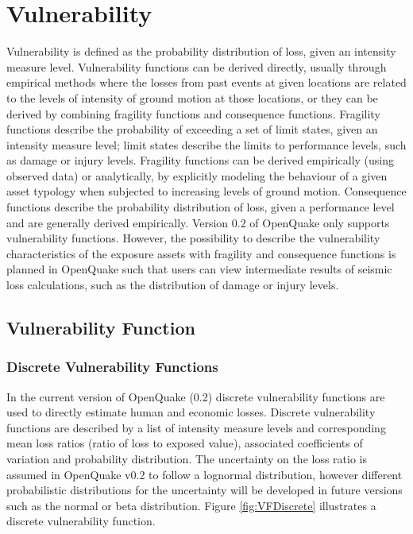 \section{Vulnerability}
Vulnerability is defined as the probability distribution of loss, given an intensity measure level. Vulnerability functions can be derived directly, usually through empirical methods where the losses from past events at given locations are related to the levels of intensity of ground motion at those locations, or they can be derived by combining fragility functions and consequence functions. Fragility functions describe the probability of exceeding a set of limit states, given an intensity measure level; limit states describe the limits to performance levels, such as damage or injury levels. Fragility functions can be derived empirically (using observed data) or analytically, by explicitly modeling the behaviour of a given asset typology when subjected to increasing levels of ground motion. Consequence functions describe the probability distribution of loss, given a performance level and are generally derived empirically. 
Version 0.2 of OpenQuake only supports vulnerability functions. However, the possibility to describe the vulnerability characteristics of the exposure assets with fragility and consequence functions is planned in OpenQuake such that users can view intermediate results of seismic loss calculations, such as the distribution of damage or injury levels. 

\subsection{Vulnerability Function}
\subsubsection{Discrete Vulnerability Functions}
In the current version of OpenQuake (0.2) discrete vulnerability functions are used to directly estimate human and economic losses. Discrete vulnerability functions are described by a list of intensity measure levels and corresponding mean loss ratios (ratio of loss to exposed value), associated coefficients of variation and probability distribution. The uncertainty on the loss ratio is assumed in OpenQuake v0.2 to follow a lognormal distribution, however different probabilistic distributions for the uncertainty will be developed in future versions such as the normal or beta distribution. Figure \ref{fig:VFDiscrete} illustrates a discrete vulnerability function.

